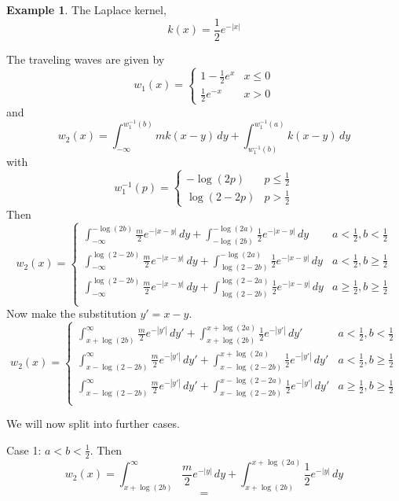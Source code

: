\documentclass[11pt]{article}
\theoremstyle{definition}
\newtheorem{ex}[thm]{Example}
\numberwithin{equation}{section}
\numberwithin{thm}{section}
\newcommand{\winva}{{w_1^{-1}(a)}}
\newcommand{\winvb}{{w_1^{-1}(b)}}
\begin{document}
\begin{ex}
The Laplace kernel,
\begin{equation}
k(x) = \frac{1}{2} e^{-|x|}
\end{equation}

The traveling waves are given by
\begin{equation}
w_1(x) =   \begin{cases} 
1 - \frac{1}{2}e^{x} & x \leq 0 \\
\frac{1}{2}e^{-x} & x > 0
\end{cases}
\end{equation}
and
\begin{equation}
w_2(x) = \int_{-\infty}^\winvb mk(x-y)\,dy + \int_{\winvb}^\winva k(x-y)\,dy
\end{equation}
with
$$ w_1^{-1}(p) = \begin{cases} -\log(2p) & p\leq \frac{1}{2} \\ \log(2-2p) & p > \frac{1}{2} \end{cases} $$
Then
$$ w_2(x) = \begin{cases}
\int_{-\infty}^{-\log(2b)} \frac{m}{2}e^{-|x-y|}\,dy + \int_{-\log(2b)}^{-\log(2a)} \frac{1}{2}e^{-|x-y|} \,dy & a<\frac{1}{2}, b < \frac{1}{2} \\
\int_{-\infty}^{\log(2-2b)} \frac{m}{2}e^{-|x-y|} \,dy + \int_{\log(2-2b)}^{-\log(2a)} \frac{1}{2}e^{-|x-y|} \,dy & a<\frac{1}{2}, b \geq \frac{1}{2} \\ 
\int_{-\infty}^{\log(2-2b)} \frac{m}{2}e^{-|x-y|} \,dy + \int_{\log(2-2b)}^{\log(2-2a)} \frac{1}{2}e^{-|x-y|} \,dy & a\geq\frac{1}{2}, b \geq \frac{1}{2} \\
\end{cases} $$
Now make the substitution $y'=x-y$.
$$ w_2(x) = \begin{cases}
\int_{x+\log(2b)}^{\infty} \frac{m}{2}e^{-|y'|}\,dy' + \int_{x+\log(2b)}^{x+\log(2a)} \frac{1}{2}e^{-|y'|} \,dy' & a<\frac{1}{2}, b < \frac{1}{2} \\
\int_{x-\log(2-2b)}^{\infty} \frac{m}{2}e^{-|y'|} \,dy' + \int_{x-\log(2-2b)}^{x+\log(2a)} \frac{1}{2}e^{-|y'|} \,dy' & a<\frac{1}{2}, b \geq \frac{1}{2} \\ 
\int_{x-\log(2-2b)}^{\infty} \frac{m}{2}e^{-|y'|} \,dy' + \int_{x-\log(2-2b)}^{x-\log(2-2a)} \frac{1}{2}e^{-|y'|} \,dy' & a\geq\frac{1}{2}, b \geq \frac{1}{2} \\
\end{cases} $$

We will now split into further cases.

Case 1: $a<b<\frac{1}{2}$. Then
$$ w_2(x) = \int_{x+\log(2b)}^{\infty} \frac{m}{2}e^{-|y|}\,dy + \int_{x+\log(2b)}^{x+\log(2a)} \frac{1}{2}e^{-|y|} \,dy $$
$$ = $$


\end{ex}
\end{document}

